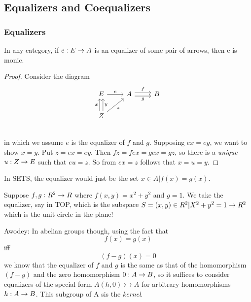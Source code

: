 \documentclass[../../notes.tex]{subfiles}
\begin{document}
\subsection{Equalizers and Coequalizers}
\subsubsection{Equalizers}
\begin{proposition}

  In any category, if $e : E \rightarrow A$ is an equalizer of some pair of arrows, then e is monic.

\end{proposition}

\begin{proof}

  Consider the diagram
  \[
    \begin{tikzcd}
      E \arrow[r, "e"] & A \arrow[r, shift left, "f"] \arrow[r, shift right, swap, "g"] & B \\
      Z \arrow[u, shift left, "x"] \arrow[u, shift right, swap, "y"] \arrow[ur, swap, "z"]& & \\
    \end{tikzcd}
  \]
  in which we assume $e$ is the equalizer of $f$ and $g$. Supposing $ex = ey$, we want to show $ x = y $. Put $z = ex = ey$. Then $fz = fex = gex = gz$, so there is a \textit{unique} $u : Z \rightarrow E$ such that $eu = z$. So from $ex = z$ follows that $x = u = y$.
  
\end{proof}

In SETS, the equalizer would just be the set $ { x \in A | f(x) = g(x) } $.


Suppose $ f, g : R^2 \rightarrow R $ where $ f (x, y) = x^2 + y^2 $
and $ g = 1 $. We take the equalizer, say in TOP, which is the subspace
$ S = { (x, y) \in R^2 | X^2 + y^2 = 1} \rightarrow R^2 $ %
which is the unit circle in the plane!


Awodey: In abelian groups though, using the fact that $$ f(x) = g(x)$$ iff $$(f-g)(x) = 0 $$ we know that the equalizer of $f$ and $g$ is the same as that of the homomorphism $(f-g)$ and the zero homomorphism $ 0 : A \rightarrow B $, so it suffices to consider equalizers of the special form $ A(h, 0) \rightarrowtail A $ for arbitrary homomorphisms $ h: A \rightarrow B $. This subgroup of A sis the \textit{kernel}.
\end{document}
